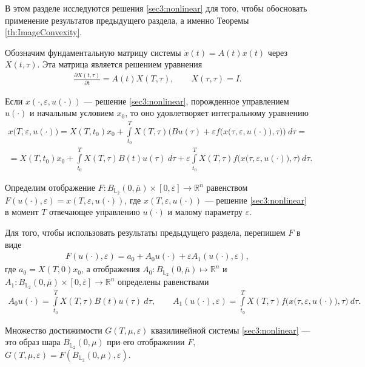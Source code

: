 \documentclass[../main.tex]{subfiles}
\begin{document}
В этом разделе исследуются решения \eqref{sec3:nonlinear} для того, чтобы обосновать применение результатов предыдущего раздела, а именно Теоремы \ref{th:ImageConvexity}. 

Обозначим фундаментальную матрицу системы $\dot{x}(t) = A(t) x(t)$ через $X(t,\tau)$.
Эта матрица является решением уравнения
\begin{gather*}
    \frac{\partial X(t,\tau)}{\partial t} = A(t) X(T,\tau), \qquad X(\tau,\tau) = I.
\end{gather*}

Если $x(\cdot,\varepsilon, u(\cdot))$ --- решение \eqref{sec3:nonlinear}, порожденное управлением $u(\cdot)$ и начальным условием $x_0$,  то оно удовлетворяет интегральному уравнению
\begin{gather*}
    x\big(T,\varepsilon, u(\cdot)\big) =
    X(T,t_0)x_0 + 
    \int\limits_{t_0}^T X(T,\tau) \bigg(Bu(\tau) +
    \varepsilon f\Big(x\big(\tau,\varepsilon, u(\cdot)\big),\tau\Big) \bigg)\ d\tau = \\ =
    X(T,t_0)x_0 +
    \int\limits_{t_0}^T X(T,\tau) B(t)u(\tau)\ d\tau 
    + \varepsilon \int\limits_{t_0}^T X(T,\tau) f\Big(x\big(\tau,\varepsilon, u(\cdot)\big),\tau\Big) \ d\tau.
\end{gather*}

Определим отображение $F:B_{\mathbb{L}_2}(0,\overline{\mu})\times [0,\overline{\varepsilon}] \to \mathbb{R}^n$ равенством $F(u(\cdot),\varepsilon) = x(T,\varepsilon,u(\cdot))$, где $x(T,\varepsilon,u(\cdot))$ --- решение \eqref{sec3:nonlinear} в момент $T$ отвечающее управлению $u(\cdot)$ и малому параметру $\varepsilon$.

Для того, чтобы использовать результаты предыдущего раздела, перепишем  $F$ в виде
\begin{gather*}
    F(u(\cdot),\varepsilon) = a_0 + A_0 u(\cdot) + \varepsilon A_1(u(\cdot), \varepsilon), 
\end{gather*}
где $a_0 = X(T,0)x_0 $, а отображения $A_0: B_{\mathbb{L}_2}(0,\overline{\mu})  \mapsto \mathbb{R}^n$ и $A_1: B_{\mathbb{L}_2}(0,\overline{\mu}) \times [0,\overline{\varepsilon}] \to \mathbb{R}^n$ определены равенствами
\begin{gather}\label{A1_def}
    A_0 u(\cdot) = \int\limits_{t_0}^T X(T,\tau) B(t)u(\tau)\ d\tau, \qquad
    A_1(u(\cdot),\varepsilon) = \int\limits_{t_0}^T X(T,\tau) f\Big(x\big(\tau,\varepsilon, u(\cdot)\big),\tau\Big) \ d\tau.
\end{gather}

Множество достижимости $G(T,\mu,\varepsilon) $  квазилинейной системы \eqref{sec3:nonlinear} --- это образ шара $B_{\mathbb{L}_2}(0,\mu)$ при его отображении $F$, $G(T,\mu,\varepsilon) = F(B_{\mathbb{L}_2}(0,\mu),\varepsilon)$.
\end{document}
